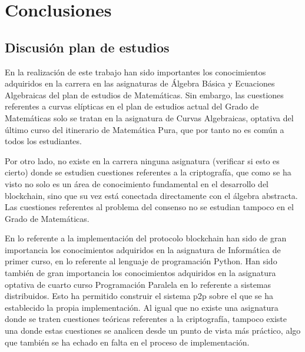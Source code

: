 \cleardoublepage

\chapter{Conclusiones}\label{conclusiones}
\section{Discusión plan de estudios}
En la realización de este trabajo han sido importantes los conocimientos adquiridos en la carrera en las asignaturas de Álgebra Básica y Ecuaciones Algebraicas del plan de estudios de Matemáticas. Sin embargo, las cuestiones referentes a curvas elípticas en el plan de estudios actual del Grado de Matemáticas solo se tratan en la asignatura de Curvas Algebraicas, optativa del último curso del itinerario de Matemática Pura, que por tanto no es común a todos los estudiantes. 

Por otro lado, no existe en la carrera ninguna asignatura (verificar si esto es cierto) donde se estudien cuestiones referentes a la criptografía, que como se ha visto no solo es un área de conocimiento fundamental en el desarrollo del blockchain, sino que su vez está conectada directamente con el álgebra abstracta.
Las cuestiones referentes al problema del consenso no se estudian tampoco en el Grado de Matemáticas.

En lo referente a la implementación del protocolo blockchain han sido de gran importancia los conocimientos adquiridos en la asignatura de Informática de primer curso, en lo referente al lenguaje de programación Python. Han sido también de gran importancia los conocimientos adquiridos en la asignatura optativa de cuarto curso Programación Paralela en lo referente a sistemas distribuidos. Esto ha permitido construir el sistema p2p sobre el que se ha establecido la propia implementación. Al igual que no existe una asignatura donde se traten cuestiones teóricas referentes a la criptografía, tampoco existe una donde estas cuestiones se analicen desde un punto de vista más práctico, algo que también se ha echado en falta en el proceso de implementación.  
